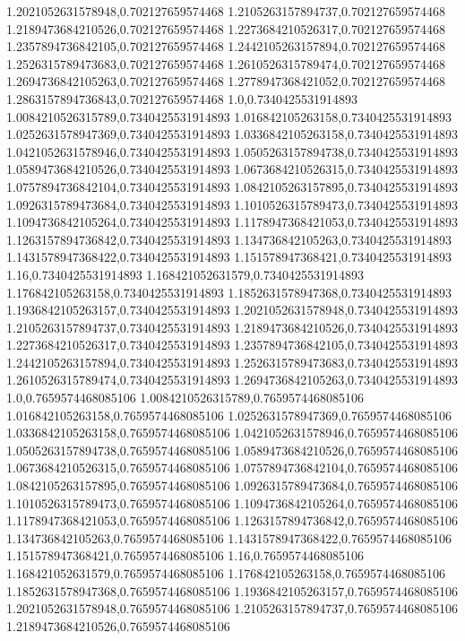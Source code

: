 1.2021052631578948,0.702127659574468
1.2105263157894737,0.702127659574468
1.2189473684210526,0.702127659574468
1.2273684210526317,0.702127659574468
1.2357894736842105,0.702127659574468
1.2442105263157894,0.702127659574468
1.2526315789473683,0.702127659574468
1.2610526315789474,0.702127659574468
1.2694736842105263,0.702127659574468
1.2778947368421052,0.702127659574468
1.2863157894736843,0.702127659574468
1.0,0.7340425531914893
1.0084210526315789,0.7340425531914893
1.016842105263158,0.7340425531914893
1.0252631578947369,0.7340425531914893
1.0336842105263158,0.7340425531914893
1.0421052631578946,0.7340425531914893
1.0505263157894738,0.7340425531914893
1.0589473684210526,0.7340425531914893
1.0673684210526315,0.7340425531914893
1.0757894736842104,0.7340425531914893
1.0842105263157895,0.7340425531914893
1.0926315789473684,0.7340425531914893
1.1010526315789473,0.7340425531914893
1.1094736842105264,0.7340425531914893
1.1178947368421053,0.7340425531914893
1.1263157894736842,0.7340425531914893
1.134736842105263,0.7340425531914893
1.1431578947368422,0.7340425531914893
1.151578947368421,0.7340425531914893
1.16,0.7340425531914893
1.168421052631579,0.7340425531914893
1.176842105263158,0.7340425531914893
1.1852631578947368,0.7340425531914893
1.1936842105263157,0.7340425531914893
1.2021052631578948,0.7340425531914893
1.2105263157894737,0.7340425531914893
1.2189473684210526,0.7340425531914893
1.2273684210526317,0.7340425531914893
1.2357894736842105,0.7340425531914893
1.2442105263157894,0.7340425531914893
1.2526315789473683,0.7340425531914893
1.2610526315789474,0.7340425531914893
1.2694736842105263,0.7340425531914893
1.0,0.7659574468085106
1.0084210526315789,0.7659574468085106
1.016842105263158,0.7659574468085106
1.0252631578947369,0.7659574468085106
1.0336842105263158,0.7659574468085106
1.0421052631578946,0.7659574468085106
1.0505263157894738,0.7659574468085106
1.0589473684210526,0.7659574468085106
1.0673684210526315,0.7659574468085106
1.0757894736842104,0.7659574468085106
1.0842105263157895,0.7659574468085106
1.0926315789473684,0.7659574468085106
1.1010526315789473,0.7659574468085106
1.1094736842105264,0.7659574468085106
1.1178947368421053,0.7659574468085106
1.1263157894736842,0.7659574468085106
1.134736842105263,0.7659574468085106
1.1431578947368422,0.7659574468085106
1.151578947368421,0.7659574468085106
1.16,0.7659574468085106
1.168421052631579,0.7659574468085106
1.176842105263158,0.7659574468085106
1.1852631578947368,0.7659574468085106
1.1936842105263157,0.7659574468085106
1.2021052631578948,0.7659574468085106
1.2105263157894737,0.7659574468085106
1.2189473684210526,0.7659574468085106

